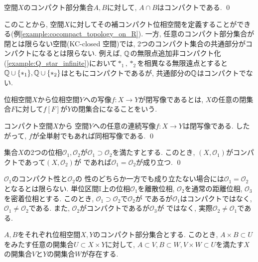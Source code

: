 \documentclass[uplatex, dvipdfmx, a4paper, 12pt, class=jsbook, crop=false]{standalone}
\begin{document}
\begin{corollary}
	\Hausdorff 空間$ X $のコンパクト部分集合$ A, B $に対して, $ A \cap B $はコンパクトである. \qed
\end{corollary}

このことから, \Hausdorff 空間$ X $に対してその補コンパクト位相空間を定義することができる(例\ref{example:cocompact_topology_on_R}). 一方, 任意のコンパクト部分集合が閉とは限らない空間(KC-closed 空間)では, 2つのコンパクト集合の共通部分がコンパクトになるとは限らない. 例えば, $ \mathbb{Q} $の無限点追加非コンパクト化(\ref{example:Q_star_infinite})において$ *_1, *_2 $を相異なる無限遠点とすると$ \mathbb{Q} \cup \{*_1\}, \mathbb{Q} \cup \{*_2\} $はともにコンパクトであるが, 共通部分の$ \mathbb{Q} $はコンパクトでない.

\begin{definition}
	位相空間$ X $から位相空間$ Y $への写像$ f \colon X \to Y $が閉写像であるとは, $ X $の任意の閉集合$ F $に対して$ f[F] $が$ Y $の閉集合になることをいう.
\end{definition}

\begin{corollary}
	コンパクト空間$ X $から \Hausdorff 空間$ Y $への任意の連続写像$ f \colon X \to Y $は閉写像である.
	したがって, $ f $が全単射でもあれば同相写像である.
	\qed
\end{corollary}

\begin{corollary}
	集合$ X $の2つの位相$ \mathcal{O}_1, \mathcal{O}_2 $が$ \mathcal{O}_1 \supset \mathcal{O}_2 $を満たすとする.
	このとき, $ (X, \mathcal{O}_1) $がコンパクトであって$ (X, \mathcal{O}_2) $が \Hausdorff であれば$ \mathcal{O}_1 = \mathcal{O}_2 $が成り立つ.
	\qed
\end{corollary}

$ \mathcal{O}_1 $のコンパクト性と$ \mathcal{O}_2 $の \Hausdorff 性のどちらか一方でも成り立たない場合には$ \mathcal{O}_1 = \mathcal{O}_2 $となるとは限らない.
単位区間$ \mathbb{I} $上の位相$ \mathcal{O}_1 $を離散位相, $ \mathcal{O}_2 $を通常の距離位相, $ \mathcal{O}_3 $を密着位相とする.
このとき, $ \mathcal{O}_1 \supset \mathcal{O}_2 $で$ \mathcal{O}_2 $が \Hausdorff であるが$ \mathcal{O}_1 $はコンパクトではなく, $ \mathcal{O}_1 \neq \mathcal{O}_2 $である.
また, $ \mathcal{O}_2 $がコンパクトであるが$ \mathcal{O}_3 $が \Hausdorff ではなく, 実際$ \mathcal{O}_2 \neq \mathcal{O}_1 $である.

\begin{proposition}
	\label{prop:Tube Lemma}
	$ A, B $をそれぞれ位相空間$ X, Y $のコンパクト部分集合とする.
	このとき, $ A \times B \subset U $をみたす任意の開集合$ U \subset X \times Y $に対して, $ A \subset V, B \subset W, V \times W \subset U $を満たす$ X $の開集合$ V $と$ Y $の開集合$ W $が存在する.
\end{proposition}
\end{document}
